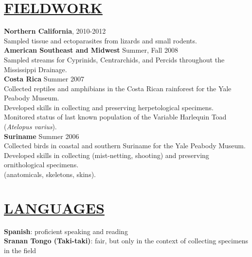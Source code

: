 \documentclass{res}
\begin{document}
\begin{resume}
\section{\underline{FIELDWORK}}
\textbf{Northern California}, 2010-2012\\\vspace{0.3mm}
\hspace{4.5mm}Sampled tissue and ectoparasites from lizards and small rodents.\\
\textbf{American Southeast and Midwest} Summer, Fall 2008\\ \vspace{0.3mm}
\hspace{4.5mm}Sampled streams for Cyprinids, Centrarchids, and Percids throughout the Mississippi Drainage.\\
\textbf{Costa Rica} Summer 2007\\ \vspace{0.3mm}
\hspace{4.5mm}Collected reptiles and amphibians in the Costa Rican rainforest for the Yale Peabody Museum.\\ \vspace{0.3mm}
\hspace{4.5mm}Developed skills in collecting and preserving herpetological specimens.\\\vspace{0.3mm}
\hspace{4.5mm}Monitored status of last known population of the Variable Harlequin Toad (\textit{Atelopus varius}).\\
\textbf{Suriname} Summer 2006\\ \vspace{0.3mm}
\hspace{4.5mm}Collected birds in coastal and southern Suriname for the Yale Peabody Museum.\\ \vspace{0.3mm}
\hspace{4.5mm}Developed skills in collecting (mist-netting, shooting) and preserving ornithological specimens.\\ \vspace{0.3mm} 
\hspace{4.5mm}(anatomicals, skeletons, skins).\\ 





\section{\underline{LANGUAGES}}
\textbf{Spanish}: proficient speaking and reading\\
\textbf{Sranan Tongo (Taki-taki)}: fair, but only in the context of collecting specimens in the field



\end{resume}
\end{document}
